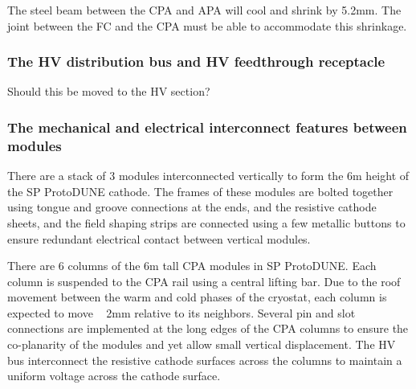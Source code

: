 The steel beam between the CPA and APA will cool and shrink by 5.2mm.  The joint between the FC and the CPA must be able to accommodate this shrinkage.


\subsubsection{The HV distribution bus and HV feedthrough receptacle }

Should this be moved to the HV section?

\subsubsection{The mechanical and electrical interconnect features between modules}

There are a stack of 3 modules interconnected vertically to form the 6m height of the SP ProtoDUNE cathode.  The frames of these modules are bolted together using tongue and groove connections at the ends, and the resistive cathode sheets, and the field shaping strips are connected  using a few metallic buttons to ensure redundant electrical contact between vertical modules.

There are 6 columns of the 6m tall CPA modules in SP ProtoDUNE.  Each column is suspended to the CPA rail using a central lifting bar.  Due to the  roof movement between the warm and cold phases of the cryostat, each column is expected to move ~ 2mm relative to its neighbors.  Several pin and slot connections are implemented at the long edges of the CPA columns to ensure the co-planarity of the modules and yet allow small vertical displacement.  The HV bus interconnect the resistive cathode surfaces across the columns to maintain a uniform voltage across the cathode surface.



